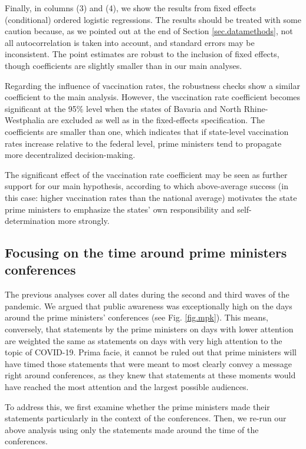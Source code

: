 \documentclass[authoryear,12pt, 3p]{elsarticle}
\theoremstyle{break}
\begin{document}
Finally, in columns (3) and (4), we show the results from fixed effects (conditional) ordered logistic regressions. The results should be treated with some caution because, as we pointed out at the end of Section \ref{sec.datamethods}, not all autocorrelation is taken into account, and standard errors may be inconsistent. The point estimates are robust to the inclusion of fixed effects, though coefficients are slightly smaller than in our main analyses.

Regarding the influence of vaccination rates, the robustness checks show a similar coefficient to the main analysis. However, the vaccination rate coefficient becomes significant at the 95\% level when the states of Bavaria and North Rhine-Westphalia are excluded as well as in the fixed-effects specification. The coefficients are smaller than one, which indicates that if state-level vaccination rates increase relative to the federal level, prime ministers tend to propagate more decentralized decision-making.

The significant effect of the vaccination rate coefficient may be seen as further support for our main hypothesis, according to which above-average success (in this case: higher vaccination rates than the national average) motivates the state prime ministers to emphasize the states' own responsibility and self-determination more strongly. 	

\subsection{Focusing on the time around prime ministers conferences}
The previous analyses cover all dates during the second and third waves of the pandemic. We argued that public awareness was exceptionally high on the days around the prime ministers' conferences (see Fig. \ref{fig.mpk}). This means, conversely, that statements by the prime ministers on days with lower attention are weighted the same as statements on days with very high attention to the topic of COVID-19. Prima facie, it cannot be ruled out that prime ministers will have timed those statements that were meant to most clearly convey a message right around conferences, as they knew that statements at these moments would have reached the most attention and the largest possible audiences.



To address this, we first examine whether the prime ministers made their statements particularly in the context of the conferences. Then, we re-run our above analysis using only the statements made around the time of the conferences.
\end{document}
